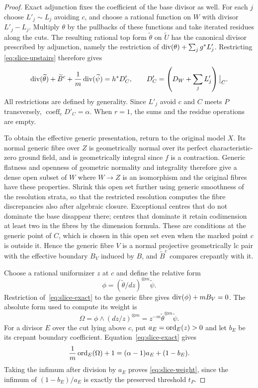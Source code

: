 \begin{proof}
Exact adjunction fixes the coefficient of the base divisor as well.
For each $j$ choose $L'_j\sim L_j$ avoiding $c$, and choose a rational
function on $W$ with divisor $L'_j-L_j$.  Multiply $\theta$ by the
pullbacks of these functions and take iterated residues along the cuts.
The resulting rational top form $\widetilde\theta$ on
$\widetilde U$ has the canonical divisor prescribed by adjunction,
namely the restriction of
$\operatorname{div}(\theta)+\sum_jg^*L'_j$.  Restricting
\eqref{eq:slice-upstairs} therefore gives
\begin{equation}\label{eq:slice-exact}
 \operatorname{div}(\widetilde\theta)+\widetilde B^c+
 \frac1m\operatorname{div}(\widetilde\psi)=h^*D'_C,
 \qquad
 D'_C=\left(D_W+\sum_j L'_j\right)\big|_C.
\end{equation}
All restrictions are defined by generality.  Since $L'_j$ avoid $c$
and $C$ meets $P$ transversely,
$\operatorname{coeff}_cD'_C=\alpha$.  When $r=1$, the sums and the
residue operations are empty.

To obtain the effective generic presentation, return to the original
model $X$.  Its normal generic fibre over $Z$ is geometrically normal
over its perfect characteristic-zero ground field, and is geometrically
integral since $f$ is a contraction.  Generic flatness and openness of
geometric normality and integrality therefore give a dense open subset
of $W$ where $W\to Z$ is an isomorphism and the original fibres have
these properties.  Shrink this open set further using generic smoothness
of the resolution strata, so that the restricted resolution computes
the fibre discrepancies also after algebraic closure.
Exceptional centres that do not dominate the base disappear
there; centres that dominate it retain codimension at least two in
the fibres by the dimension formula.  These are conditions at the
generic point of $C$, which is chosen in this open set even when the
marked point $c$ is outside it.  Hence the generic
fibre $V$ is a normal projective geometrically lc pair with the
effective boundary $B_V$ induced by $B$, and $\widetilde B^c$ compares
crepantly with it.

Choose a rational uniformizer $z$ at $c$ and define the relative form
\[
 \phi=(\widetilde\theta/dz)^{\otimes m}\widetilde\psi.
\]
Restriction of~\eqref{eq:slice-exact} to the generic fibre gives
$\operatorname{div}(\phi)+mB_V=0$.  The absolute form used to compute its weight is
\[
 \Omega=\phi\wedge(dz/z)^{\otimes m}
       =z^{-m}\widetilde\theta^{\otimes m}\widetilde\psi.
\]
For a divisor $E$ over the cut lying above $c$, put
$a_E=\operatorname{ord}_E(z)>0$ and let $b_E$ be its crepant boundary coefficient.
Equation~\eqref{eq:slice-exact} gives
\[
 \frac1m\operatorname{ord}_E(\Omega)+1
       =(\alpha-1)a_E+(1-b_E).
\]
Taking the infimum after division by $a_E$ proves
\eqref{eq:slice-weight}, since the infimum of
$(1-b_E)/a_E$ is exactly the preserved threshold $t_P$.
\end{proof}

